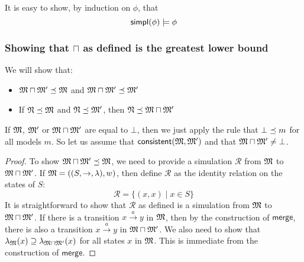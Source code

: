 \NI It is easy to show, by induction on $\phi$, that
\[
\mathsf{simpl}(\phi) \models \phi
\]

\subsubsection{Showing that $\sqcap$ as defined is the greatest lower bound}
We will show that:
\begin{itemize}
\item
$\frak{M} \sqcap \frak{M}' \preceq \frak{M}$ and $\frak{M} \sqcap \frak{M}' \preceq \frak{M}'$
\item
If $\frak{N} \preceq \frak{M}$ and $\frak{N} \preceq \frak{M}'$, then $\frak{N} \preceq \frak{M} \sqcap \frak{M}'$
\end{itemize}
If $\frak{M}$, $ \frak{M}'$ or $\frak{M} \sqcap \frak{M}'$ are equal to $\bot$, then we just apply the rule that $\bot \preceq m$ for all models $m$. 
So let us assume that $\mathsf{consistent}(\frak{M}, \frak{M}')$ and that $\frak{M} \sqcap \frak{M}'  \neq \bot$.

\begin{proof}
To show $\frak{M} \sqcap \frak{M}' \preceq \frak{M}$, we need to provide a simulation $\mathcal{R}$ from $\frak{M}$ to  $\frak{M} \sqcap \frak{M}'$.
If $\frak{M} = ((S,\rightarrow,\lambda),w)$, then define $\mathcal{R}$ as the identity relation on the states of $S$:
\[
\mathcal{R} = \{(x,x) \; | \; x \in S\}
\]
It is straightforward to show that $\mathcal{R}$ as defined is a simulation from $\frak{M}$ to  $\frak{M} \sqcap \frak{M}'$.
If there is a transition $x \xrightarrow{a} y$ in $\frak{M}$, then by the construction of $\mathsf{merge}$, there is also a transition $x \xrightarrow{a} y$ in $\frak{M} \sqcap \frak{M}'$.
We also need to show that $\lambda_{\frak{M}}(x) \supseteq \lambda_{\frak{M} \sqcap \frak{M}'}(x)$ for all states $x$ in $\frak{M}$. This is immediate from the construction of $\mathsf{merge}$.

\end{proof}

